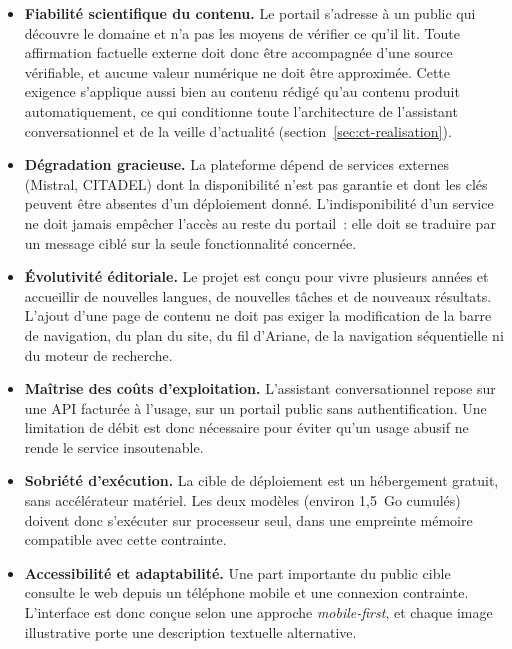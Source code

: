 \begin{itemize}
	\item \textbf{Fiabilité scientifique du contenu.} Le portail s'adresse à un public
	qui découvre le domaine et n'a pas les moyens de vérifier ce qu'il lit. Toute
	affirmation factuelle externe doit donc être accompagnée d'une source vérifiable,
	et aucune valeur numérique ne doit être approximée. Cette exigence s'applique
	aussi bien au contenu rédigé qu'au contenu produit automatiquement, ce qui
	conditionne toute l'architecture de l'assistant conversationnel et de la veille
	d'actualité (section~\ref{sec:ct-realisation}).

	\item \textbf{Dégradation gracieuse.} La plateforme dépend de services externes
	(Mistral, CITADEL) dont la disponibilité n'est pas garantie et dont les clés
	peuvent être absentes d'un déploiement donné. L'indisponibilité d'un service ne
	doit jamais empêcher l'accès au reste du portail~: elle doit se traduire par un
	message ciblé sur la seule fonctionnalité concernée.

	\item \textbf{Évolutivité éditoriale.} Le projet est conçu pour vivre plusieurs
	années et accueillir de nouvelles langues, de nouvelles tâches et de nouveaux
	résultats. L'ajout d'une page de contenu ne doit pas exiger la modification de la
	barre de navigation, du plan du site, du fil d'Ariane, de la navigation
	séquentielle ni du moteur de recherche.

	\item \textbf{Maîtrise des coûts d'exploitation.} L'assistant conversationnel
	repose sur une API facturée à l'usage, sur un portail public sans
	authentification. Une limitation de débit est donc nécessaire pour éviter qu'un
	usage abusif ne rende le service insoutenable.

	\item \textbf{Sobriété d'exécution.} La cible de déploiement est un hébergement
	gratuit, sans accélérateur matériel. Les deux modèles (environ 1,5~Go cumulés)
	doivent donc s'exécuter sur processeur seul, dans une empreinte mémoire
	compatible avec cette contrainte.

	\item \textbf{Accessibilité et adaptabilité.} Une part importante du public cible
	consulte le web depuis un téléphone mobile et une connexion contrainte. L'interface
	est donc conçue selon une approche \textit{mobile-first}, et chaque image
	illustrative porte une description textuelle alternative.
\end{itemize}

